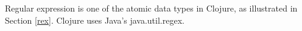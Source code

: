 \documentclass{standalone}
\begin{document}

Regular expression is one of the atomic data types in Clojure, as illustrated in Section \ref{rex}. Clojure uses Java's java.util.regex.
\end{document}

